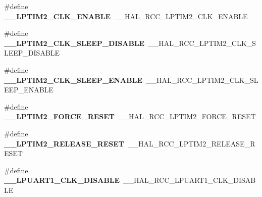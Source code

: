 \begin{DoxyCompactItemize}
\item 
\#define {\bfseries \+\_\+\+\_\+\+L\+P\+T\+I\+M2\+\_\+\+C\+L\+K\+\_\+\+E\+N\+A\+B\+LE}~\+\_\+\+\_\+\+H\+A\+L\+\_\+\+R\+C\+C\+\_\+\+L\+P\+T\+I\+M2\+\_\+\+C\+L\+K\+\_\+\+E\+N\+A\+B\+LE\hypertarget{group___h_a_l___r_c_c___aliased_gabb780b00e76662c8ea7f55b1d333ba17}{}\label{group___h_a_l___r_c_c___aliased_gabb780b00e76662c8ea7f55b1d333ba17}

\item 
\#define {\bfseries \+\_\+\+\_\+\+L\+P\+T\+I\+M2\+\_\+\+C\+L\+K\+\_\+\+S\+L\+E\+E\+P\+\_\+\+D\+I\+S\+A\+B\+LE}~\+\_\+\+\_\+\+H\+A\+L\+\_\+\+R\+C\+C\+\_\+\+L\+P\+T\+I\+M2\+\_\+\+C\+L\+K\+\_\+\+S\+L\+E\+E\+P\+\_\+\+D\+I\+S\+A\+B\+LE\hypertarget{group___h_a_l___r_c_c___aliased_ga5521c5857e0afe9d16e1649f3099cfbb}{}\label{group___h_a_l___r_c_c___aliased_ga5521c5857e0afe9d16e1649f3099cfbb}

\item 
\#define {\bfseries \+\_\+\+\_\+\+L\+P\+T\+I\+M2\+\_\+\+C\+L\+K\+\_\+\+S\+L\+E\+E\+P\+\_\+\+E\+N\+A\+B\+LE}~\+\_\+\+\_\+\+H\+A\+L\+\_\+\+R\+C\+C\+\_\+\+L\+P\+T\+I\+M2\+\_\+\+C\+L\+K\+\_\+\+S\+L\+E\+E\+P\+\_\+\+E\+N\+A\+B\+LE\hypertarget{group___h_a_l___r_c_c___aliased_ga1befaabde57db93bcf04e28dffd1d468}{}\label{group___h_a_l___r_c_c___aliased_ga1befaabde57db93bcf04e28dffd1d468}

\item 
\#define {\bfseries \+\_\+\+\_\+\+L\+P\+T\+I\+M2\+\_\+\+F\+O\+R\+C\+E\+\_\+\+R\+E\+S\+ET}~\+\_\+\+\_\+\+H\+A\+L\+\_\+\+R\+C\+C\+\_\+\+L\+P\+T\+I\+M2\+\_\+\+F\+O\+R\+C\+E\+\_\+\+R\+E\+S\+ET\hypertarget{group___h_a_l___r_c_c___aliased_ga65872113839cb5569f584e6373e2e006}{}\label{group___h_a_l___r_c_c___aliased_ga65872113839cb5569f584e6373e2e006}

\item 
\#define {\bfseries \+\_\+\+\_\+\+L\+P\+T\+I\+M2\+\_\+\+R\+E\+L\+E\+A\+S\+E\+\_\+\+R\+E\+S\+ET}~\+\_\+\+\_\+\+H\+A\+L\+\_\+\+R\+C\+C\+\_\+\+L\+P\+T\+I\+M2\+\_\+\+R\+E\+L\+E\+A\+S\+E\+\_\+\+R\+E\+S\+ET\hypertarget{group___h_a_l___r_c_c___aliased_gadd807afbe3725b62026e46e99531efac}{}\label{group___h_a_l___r_c_c___aliased_gadd807afbe3725b62026e46e99531efac}

\item 
\#define {\bfseries \+\_\+\+\_\+\+L\+P\+U\+A\+R\+T1\+\_\+\+C\+L\+K\+\_\+\+D\+I\+S\+A\+B\+LE}~\+\_\+\+\_\+\+H\+A\+L\+\_\+\+R\+C\+C\+\_\+\+L\+P\+U\+A\+R\+T1\+\_\+\+C\+L\+K\+\_\+\+D\+I\+S\+A\+B\+LE\hypertarget{group___h_a_l___r_c_c___aliased_gaed58b8ae517de9035a76e9c804087fa6}{}\label{group___h_a_l___r_c_c___aliased_gaed58b8ae517de9035a76e9c804087fa6}


\end{DoxyCompactItemize}
